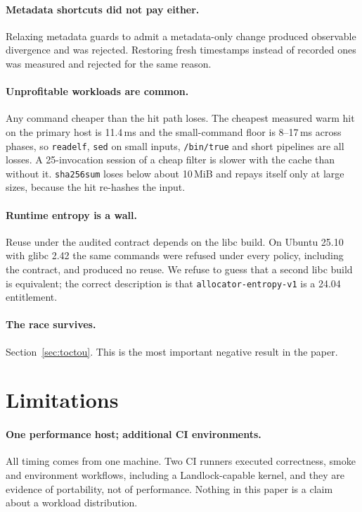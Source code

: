 \paragraph{Metadata shortcuts did not pay either.}
Relaxing metadata guards to admit a metadata-only change produced observable divergence and was
rejected. Restoring fresh timestamps instead of recorded ones was measured and rejected for the
same reason.

\paragraph{Unprofitable workloads are common.}
Any command cheaper than the hit path loses. The cheapest measured warm hit on the primary host is
11.4\,ms and the small-command floor is 8--17\,ms across phases, so \texttt{readelf},
\texttt{sed} on small inputs, \texttt{/bin/true} and short pipelines are all losses. A 25-invocation
session of a cheap filter is slower with the cache than without it. \texttt{sha256sum} loses below
about 10\,MiB and repays itself only at large sizes, because the hit re-hashes the input.

\paragraph{Runtime entropy is a wall.}
Reuse under the audited contract depends on the libc build. On Ubuntu 25.10 with glibc 2.42 the
same commands were refused under every policy, including the contract, and produced no reuse. We
refuse to guess that a second libc build is equivalent; the correct description is that
\texttt{allocator-entropy-v1} is a 24.04 entitlement.

\paragraph{The race survives.}
Section~\ref{sec:toctou}. This is the most important negative result in the paper.

\section{Limitations}

\paragraph{One performance host; additional CI environments.}
All timing comes from one machine. Two CI runners executed correctness, smoke and environment
workflows, including a Landlock-capable kernel, and they are evidence of portability, not of
performance. Nothing in this paper is a claim about a workload distribution.

